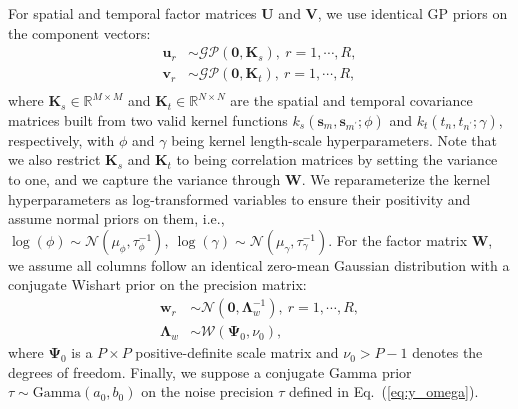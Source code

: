\documentclass[12pt]{article}
\newcommand{\bd}[1]{\boldsymbol{#1}}
\begin{document}
For spatial and temporal factor matrices $\boldsymbol{U}$ and $\boldsymbol{V}$, we use identical GP priors on the component vectors:
\begin{equation} \label{eq:factorUV}
\begin{aligned}
    \boldsymbol{u}_{r}&\sim\mathcal{GP}\left(\boldsymbol{0},\boldsymbol{K}_{s}\right),~r=1,\cdots,R, \\
    \boldsymbol{v}_{r}&\sim\mathcal{GP}\left(\boldsymbol{0},\boldsymbol{K}_{t}\right),~r=1,\cdots,R, \\
\end{aligned}
\end{equation}
where $\boldsymbol{K}_{s}\in\mathbb{R}^{M\times M}$ and $\boldsymbol{K}_{t}\in\mathbb{R}^{N\times N}$ are the spatial and temporal covariance matrices built from two valid kernel functions $k_{s}(\bd{s}_m,\bd{s}_{m^{\prime}};\phi)$ and $k_{t}(t_n,t_{n^{\prime}};\gamma)$, respectively, with $\phi$ and $\gamma$ being kernel length-scale hyperparameters. Note that we also restrict $\boldsymbol{K}_{s}$ and $\boldsymbol{K}_{t}$ to being correlation matrices by setting the variance to one, and we capture the variance through $\boldsymbol{W}$. We reparameterize the kernel hyperparameters as log-transformed variables to ensure their positivity and assume normal priors on them, i.e., $\log(\phi)\sim\mathcal{N}(\mu_{\phi},\tau_{\phi}^{-1}),~\log(\gamma)\sim\mathcal{N}(\mu_{\gamma},\tau_{\gamma}^{-1})$.
For the factor matrix $\boldsymbol{W}$, we assume all columns follow an identical zero-mean Gaussian distribution with a conjugate Wishart prior on the precision matrix:
\begin{equation} \label{eq:factorW}
\begin{aligned}
    \boldsymbol{w}_{r} &\sim\mathcal{N}\left(\boldsymbol{0},\boldsymbol{\Lambda}_{w}^{-1}\right),~r=1,\cdots,R, \\
    \boldsymbol{\Lambda}_{w} &\sim\mathcal{W}\left(\boldsymbol{\Psi}_{0},\nu_{0}\right),
    \end{aligned}
\end{equation}
where $\boldsymbol{\Psi}_{0}$ is a $P\times P$ positive-definite scale matrix and $\nu_{0}>P-1$ denotes the degrees of freedom. Finally, we suppose a conjugate Gamma prior $\tau\sim\text{Gamma}(a_{0},b_{0})$ on the noise precision $\tau$ defined in Eq.~(\ref{eq:y_omega}).
\end{document}
